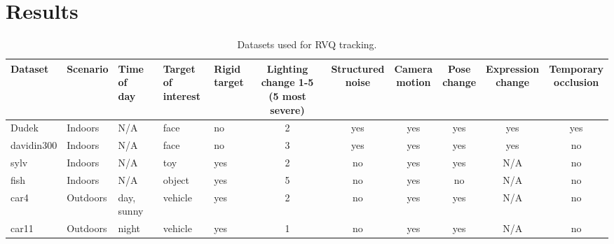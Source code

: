 %
%
%

\chapter{Results}
\label{chap_results}	


\begin{table}[t]
\footnotesize
\begin{tabular}{p{0.6in}|p{0.6in}p{0.6in}p{0.4in}p{0.4in}cccccc}
Dataset 		&Scenario	     &\parbox[c]{0.4in}{\center Time of \\day} 	&\parbox[c]{0.26in}{\center Target of \\interest}  &\parbox{0.3in}{\center Rigid \\target} 	&\parbox{0.4in}{\center Lighting change 1-5 \\(5 most severe)}  	&\parbox{0.5in}{\center Structured \\noise} 	&\parbox{0.4in}{\center Camera \\motion} 	&\parbox{0.3in}{\center Pose \\change} 	&\parbox{0.45in}{\center Expression \\change} 	&\parbox{0.3in}{\center Temporary \\occlusion} 	\\\hline
Dudek 		&Indoors		&N/A 				&face 		&no 	&2 	&yes 	&yes 	&yes 	&yes 	&yes 		\\\hline
davidin300 	&Indoors		&N/A				&face			&no	&3		&yes	&yes	&yes	&yes	&no		\\\hline
sylv			&Indoors		&N/A				&toy			&yes	&2		&no	&yes	&yes	&N/A	&no		\\\hline
fish			&Indoors		&N/A				&object		&yes	&5		&no	&yes	&no	&N/A	&no		\\\hline
car4			&Outdoors 	&day, sunny		&vehicle		&yes	&2		&no	&yes	&yes	&N/A	&no		\\\hline
car11			&Outdoors	&night			&vehicle		&yes	&1		&no	&yes	&yes	&N/A	&no		\\\hline
\end{tabular}
\caption{Datasets used for RVQ tracking.}
\label{Tab:datasets_used}
\end{table}


